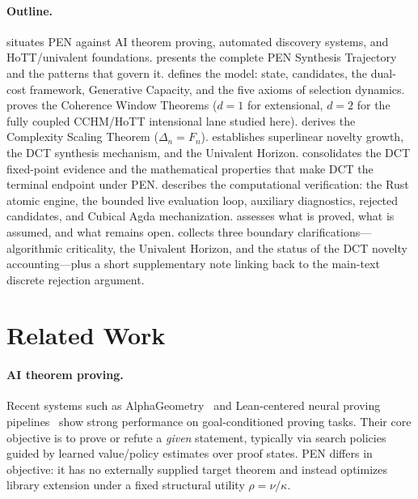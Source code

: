 \documentclass[11pt,a4paper]{article}
\theoremstyle{plain}
\theoremstyle{definition}
\theoremstyle{remark}
\begin{document}
\paragraph{Outline.}
 situates PEN against AI theorem proving, automated discovery systems, and HoTT/univalent foundations.
 presents the complete PEN Synthesis Trajectory and the patterns that govern it.
 defines the model: state, candidates, the dual-cost framework, Generative Capacity, and the five axioms of selection dynamics.
 proves the Coherence Window Theorems ($d = 1$ for extensional, $d = 2$ for the fully coupled CCHM/HoTT intensional lane studied here).
 derives the Complexity Scaling Theorem ($\Delta_n = F_n$).
 establishes superlinear novelty growth, the DCT synthesis mechanism, and the Univalent Horizon.
 consolidates the DCT fixed-point evidence and the mathematical properties that make DCT the terminal endpoint under PEN.
 describes the computational verification: the Rust atomic engine, the bounded live evaluation loop, auxiliary diagnostics, rejected candidates, and Cubical Agda mechanization.
 assesses what is proved, what is assumed, and what remains open.
 collects three boundary clarifications---algorithmic criticality, the Univalent Horizon, and the status of the DCT novelty accounting---plus a short supplementary note linking back to the main-text discrete rejection argument.

\section{Related Work}
\label{sec:related}

\paragraph{AI theorem proving.}
Recent systems such as AlphaGeometry~\cite{alphageometry} and Lean-centered neural proving pipelines~\cite{leandojo,openai-lean} show strong performance on goal-conditioned proving tasks.
Their core objective is to prove or refute a \emph{given} statement, typically via search policies guided by learned value/policy estimates over proof states.
PEN differs in objective: it has no externally supplied target theorem and instead optimizes library extension under a fixed structural utility $\rho=\nu/\kappa$.
\end{document}

